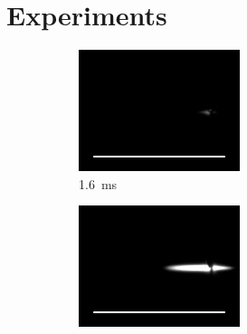 \chapter{Experiments}
    
    \begin{figure}[h]
        \centering
        \begin{subfigure}[t]{0.3\textwidth}
            \centering
            \includegraphics[width=\textwidth]{assets/5 results/ignitionFrames/16.jpg}
            \caption{\qty{1.6}{ms}}
            \label{fig:ignition_frames_16}
        \end{subfigure}
        \hfill
        \begin{subfigure}[t]{0.3\textwidth}
            \centering
            \includegraphics[width=\textwidth]{assets/5 results/ignitionFrames/17.jpg}

\end{subfigure}
\end{figure}
